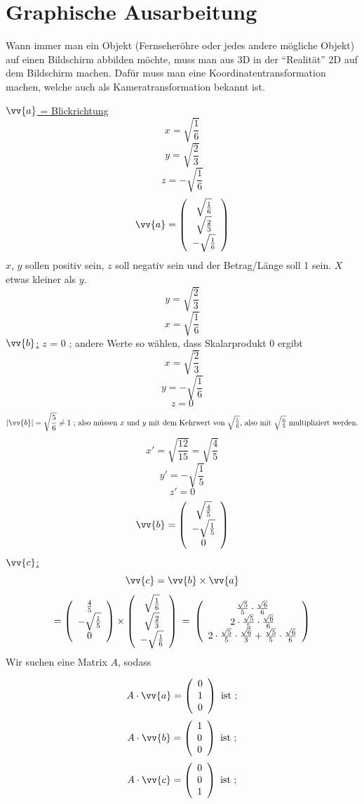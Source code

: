 \section{\textbf{Graphische Ausarbeitung}}
Wann immer man ein Objekt (Fernseheröhre oder jedes andere mögliche Objekt) auf einen Bildschirm abbilden möchte, muss man aus 3D in der "`Realität"' 2D auf dem Bildschirm machen. Dafür muss man eine Koordinatentransformation machen, welche auch als Kameratransformation bekannt ist.

\underline{$\vv{a}$ = Blickrichtung}
$$x = \sqrt{\frac{1}{6}}$$
$$y = \sqrt{\frac{2}{3}}$$
$$z = -\sqrt{\frac{1}{6}}$$
$$\vv{a}=\vektor{\sqrt{\frac{1}{6}}}{\sqrt{\frac{2}{3}}}{-\sqrt{\frac{1}{6}}} $$
$x$, $y$ sollen positiv sein, $z$ soll negativ sein und der Betrag/Länge soll 1 sein. $X$ etwas kleiner als $y$.
$$y= \sqrt{\frac{2}{3}}$$
$$x= \sqrt{\frac{1}{6}}$$
\underline{$\vv{b}$:}
$z$ = 0 ; andere Werte so wählen, dass Skalarprodukt 0 ergibt
$$x= \sqrt{\frac{2}{3}}$$
$$y=-\sqrt{\frac{1}{6}}$$
$$z=0$$
$$|\vv{b}| = \sqrt{\frac{5}{6}}\neq 1\mbox{ ; also müssen $x$ und $y$ mit dem Kehrwert von $\sqrt{\frac{5}{6}}$, also mit $\sqrt{\frac{6}{5}}$ multipliziert werden.}$$
$$x' = \sqrt{\frac{12}{15}} = \sqrt{\frac{4}{5}}$$
$$y' = - \sqrt{\frac{1}{5}}$$
$$z' = 0$$
$$\vv{b}= \vektor{\sqrt{\frac{4}{5}}}{-\sqrt{\frac{1}{5}}}{0}$$
\underline{$\vv{c}$:}
$$\vv{c} = \vv{b}\times  \vv{a}$$
$$= \left(\begin{array}{c}\frac{4}{5}\\-\sqrt{\frac{1}{5}}\\0\end{array}\right)
      \times \left(\begin{array}{c}\sqrt{\frac{1}{6}}\\\sqrt{\frac{2}{3}}\\-\sqrt{\frac{1}{6}}\end{array}\right) \mbox{ = } 
     \left(\begin{array}{c} 
     \frac{\sqrt{5}}{5}\cdot\frac{\sqrt{6}}{6}\\2\cdot\frac{\sqrt{5}}{5}\cdot\frac{\sqrt{6}}{6}\\2\cdot\frac{\sqrt{5}}{5}\cdot\frac{\sqrt{6}}{3}+\frac{\sqrt{5}}{5}\cdot\frac{\sqrt{6}}{6}\end{array}\right)
$$
Wir suchen eine Matrix $A$, sodass

     $$A\cdot \vv{a}=\vektor{0}{1}{0}\mbox{ ist ;} $$
     $$A\cdot \vv{b}=\vektor{1}{0}{0}\mbox{ ist ;}$$
     $$A\cdot \vv{c}=\vektor{0}{0}{1}\mbox{ ist ;} $$
     

